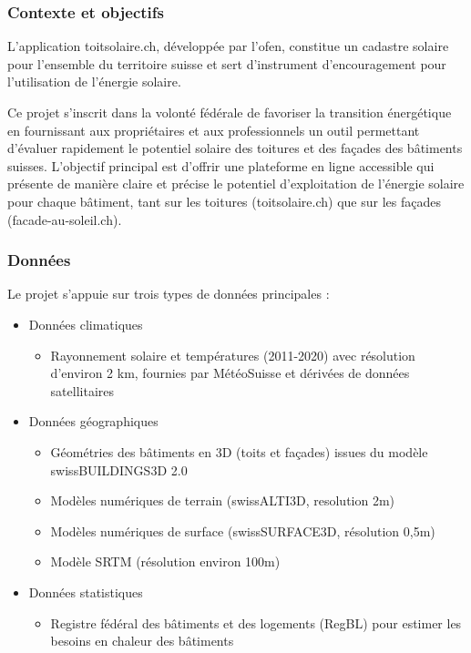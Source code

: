 \subsubsection{Contexte et objectifs}
\par{L'application toitsolaire.ch, développée par l'\acrshort{ofen}, constitue un cadastre solaire pour l'ensemble du territoire suisse et sert d'instrument d'encouragement pour l'utilisation de l'énergie solaire.}

\par{Ce projet s'inscrit dans la volonté fédérale de favoriser la transition énergétique en fournissant aux propriétaires et aux professionnels un outil permettant d'évaluer rapidement le potentiel solaire des toitures et des façades des bâtiments suisses. L'objectif principal est d'offrir une plateforme en ligne accessible qui présente de manière claire et précise le potentiel d'exploitation de l'énergie solaire pour chaque bâtiment, tant sur les toitures (toitsolaire.ch) que sur les façades (facade-au-soleil.ch).}

\subsubsection{Données}
\par{Le projet s'appuie sur trois types de données principales :}
\begin{itemize}
    \item Données climatiques
    \begin{itemize}
        \item Rayonnement solaire et températures (2011-2020) avec résolution d'environ 2 km, fournies par MétéoSuisse et dérivées de données satellitaires
    \end{itemize}
    \item Données géographiques
    \begin{itemize}
        \item Géométries des bâtiments en 3D (toits et façades) issues du modèle swissBUILDINGS3D 2.0
        \item Modèles numériques de terrain (swissALTI3D, resolution 2m)
        \item Modèles numériques de surface (swissSURFACE3D, résolution 0,5m)
        \item Modèle SRTM (résolution environ 100m)
    \end{itemize}
    \item Données statistiques
        \begin{itemize}
        \item Registre fédéral des bâtiments et des logements (RegBL) pour estimer les besoins en chaleur des bâtiments
        \end{itemize}
    \end{itemize}

